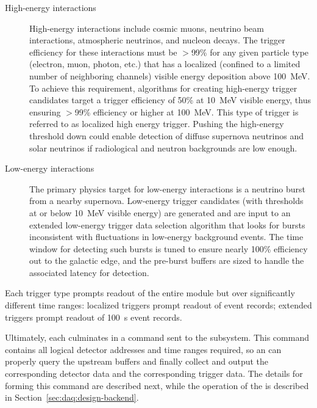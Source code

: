 \begin{description}
\item[High-energy interactions] High-energy interactions include cosmic muons, neutrino beam interactions, atmospheric neutrinos, and nucleon decays. 
  The trigger efficiency for these interactions must be $>$99\% for any given particle type (electron, muon, photon, etc.) that has a localized (confined to a limited number of neighboring channels) visible energy deposition above \SI{100}{\MeV}.
  To achieve this requirement, algorithms for creating high-energy trigger candidates  target a trigger efficiency of 50\% at \SI{10}{\MeV} visible energy, thus ensuring $>$99\% efficiency or higher at \SI{100}{\MeV}.
  This type of trigger is referred to as localized high energy trigger. 
  Pushing the high-energy threshold down could enable detection of diffuse supernova neutrinos and solar neutrinos if radiological and neutron backgrounds are low enough.

\item[Low-energy interactions] The primary physics target for
  low-energy interactions is a neutrino burst from a nearby supernova. 
  Low-energy trigger candidates (with thresholds at or below
  \SI{10}{\MeV} visible energy) are generated and are input to an
  extended low-energy trigger data selection algorithm that looks for bursts inconsistent with fluctuations in low-energy background events. 
  The time window for detecting such bursts is tuned to ensure
  nearly 100\% efficiency out to the galactic edge, and the pre-burst
  buffers are sized to handle the associated latency for detection.

\end{description}

\noindent Each trigger type prompts readout
of the entire module but over significantly different time
ranges: localized triggers prompt readout of \spreadout event records; extended
triggers prompt readout of \SI{100}{\second} event records. 

Ultimately, each  culminates in a command sent to
the  subsystem. 
This command contains all logical detector addresses and time ranges
required, so an  can properly query the upstream 
buffers and finally collect and output the corresponding detector data
and the corresponding trigger data. The details for forming this
command are described next, while the operation of the  is
described in Section~\ref{sec:daq:design-backend}.

